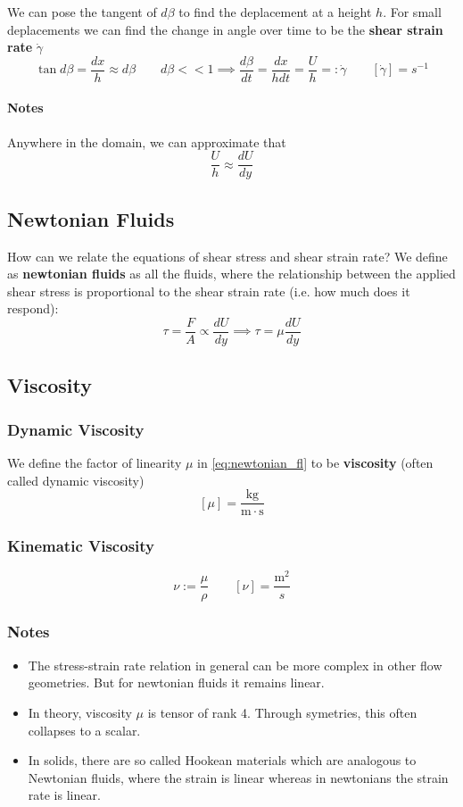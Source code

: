 We can pose the tangent of $d\beta$ to find the deplacement at a height $h$. For small deplacements we can find the change in angle over time to be the \textbf{shear strain rate} $\dot \gamma$
$$
\tan d\beta = \frac {dx}h \approx d\beta \qquad d\beta << 1\implies \frac {d\beta}{dt} = \frac{dx}{hdt}=\frac Uh =: \dot \gamma\qquad [\dot \gamma] = s^{-1}
$$
\paragraph{Notes}
Anywhere in the domain, we can approximate that
$$
\frac Uh \approx\frac {dU}{dy}
$$
\subsection{Newtonian Fluids}
How can we relate the equations of shear stress and shear strain rate? 
We define as \textbf{newtonian fluids} as all the fluids, where the relationship between the applied shear stress is proportional to the shear strain rate (i.e. how much does it respond):
\begin{equation}
\tau = \frac FA \propto \frac {dU}{dy}\implies \boxed{\tau = \mu \frac{dU}{dy}}\label{eq:newtonian_fl}
\end{equation}

\subsection{Viscosity}

\subsubsection{Dynamic Viscosity}
We define the factor of linearity $\mu$ in \ref{eq:newtonian_fl} to be \textbf{viscosity} (often called dynamic viscosity)
$$
[\mu] = \frac {\mathrm{kg}}{\mathrm m\cdot \mathrm s}
$$

\subsubsection{Kinematic Viscosity}

$$
\nu := \frac \mu \rho\qquad [\nu] =\frac {\mathrm m^2}{s} 
$$
\subsubsection{Notes} 
\begin{itemize}
    \item The stress-strain rate relation in general can be more complex in other flow geometries. But for newtonian fluids it remains linear.
    \item In theory, viscosity $\mu$ is tensor of rank 4. Through symetries, this often collapses to a scalar.
    \item In solids, there are so called Hookean materials which are analogous to Newtonian fluids, where the strain is linear whereas in newtonians the strain rate is linear.
\end{itemize}
